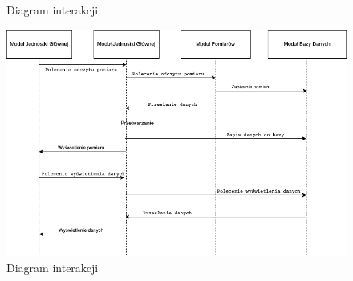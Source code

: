 \documentclass{article}
\begin{document}
\begin{figure}
    \centering
    \begin{minipage}{0.6\textwidth}
        \centering
        \large Diagram interakcji
    \end{minipage}
    \includegraphics[scale=0.5]{4.1.4.png}
    \caption{Diagram interakcji}
    \label{etykieta15}
\end{figure}
\end{document}

